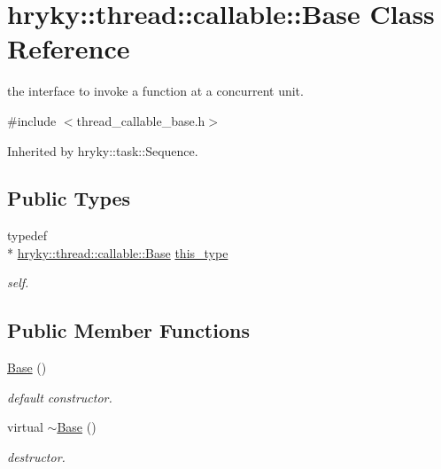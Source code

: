 \hypertarget{classhryky_1_1thread_1_1callable_1_1_base}{\section{hryky\-:\-:thread\-:\-:callable\-:\-:Base Class Reference}
\label{classhryky_1_1thread_1_1callable_1_1_base}
}


the interface to invoke a function at a concurrent unit.  




{\ttfamily \#include $<$thread\-\_\-callable\-\_\-base.\-h$>$}



Inherited by hryky\-::task\-::\-Sequence.

\subsection*{Public Types}
\begin{DoxyCompactItemize}
\item 
\hypertarget{classhryky_1_1thread_1_1callable_1_1_base_ad3922e54cf5990b08625fad40aae60b3}{typedef \\*
\hyperlink{classhryky_1_1thread_1_1callable_1_1_base}{hryky\-::thread\-::callable\-::\-Base} \hyperlink{classhryky_1_1thread_1_1callable_1_1_base_ad3922e54cf5990b08625fad40aae60b3}{this\-\_\-type}}\label{classhryky_1_1thread_1_1callable_1_1_base_ad3922e54cf5990b08625fad40aae60b3}

\begin{DoxyCompactList}\small\item\em self. \end{DoxyCompactList}\end{DoxyCompactItemize}
\subsection*{Public Member Functions}
\begin{DoxyCompactItemize}
\item 
\hypertarget{classhryky_1_1thread_1_1callable_1_1_base_aeda337d4158d695451f0dabc9d88cf58}{\hyperlink{classhryky_1_1thread_1_1callable_1_1_base_aeda337d4158d695451f0dabc9d88cf58}{Base} ()}\label{classhryky_1_1thread_1_1callable_1_1_base_aeda337d4158d695451f0dabc9d88cf58}

\begin{DoxyCompactList}\small\item\em default constructor. \end{DoxyCompactList}\item 
\hypertarget{classhryky_1_1thread_1_1callable_1_1_base_aa35fa37ef7032fb5843cd834f3c323fd}{virtual \hyperlink{classhryky_1_1thread_1_1callable_1_1_base_aa35fa37ef7032fb5843cd834f3c323fd}{$\sim$\-Base} ()}\label{classhryky_1_1thread_1_1callable_1_1_base_aa35fa37ef7032fb5843cd834f3c323fd}

\begin{DoxyCompactList}\small\item\em destructor. \end{DoxyCompactList}\end{DoxyCompactItemize}


